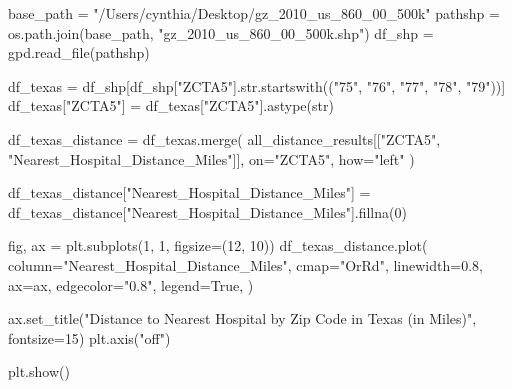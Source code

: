 \documentclass[
  letterpaper,
  DIV=11,
  numbers=noendperiod]{scrartcl}
\newenvironment{Shaded}{\begin{snugshade}}{\end{snugshade}}
\newcommand{\BuiltInTok}[1]{\textcolor[rgb]{0.00,0.23,0.31}{#1}}
\newcommand{\DecValTok}[1]{\textcolor[rgb]{0.68,0.00,0.00}{#1}}
\newcommand{\FloatTok}[1]{\textcolor[rgb]{0.68,0.00,0.00}{#1}}
\newcommand{\NormalTok}[1]{\textcolor[rgb]{0.00,0.23,0.31}{#1}}
\newcommand{\OperatorTok}[1]{\textcolor[rgb]{0.37,0.37,0.37}{#1}}
\newcommand{\StringTok}[1]{\textcolor[rgb]{0.13,0.47,0.30}{#1}}
\newcommand{\VariableTok}[1]{\textcolor[rgb]{0.07,0.07,0.07}{#1}}
\begin{document}
\begin{Shaded}
\begin{Highlighting}[]
\NormalTok{base\_path }\OperatorTok{=} \StringTok{"/Users/cynthia/Desktop/gz\_2010\_us\_860\_00\_500k"}
\NormalTok{pathshp }\OperatorTok{=}\NormalTok{ os.path.join(base\_path, }\StringTok{"gz\_2010\_us\_860\_00\_500k.shp"}\NormalTok{)}
\NormalTok{df\_shp }\OperatorTok{=}\NormalTok{ gpd.read\_file(pathshp)}

\NormalTok{df\_texas }\OperatorTok{=}\NormalTok{ df\_shp[df\_shp[}\StringTok{"ZCTA5"}\NormalTok{].}\BuiltInTok{str}\NormalTok{.startswith((}\StringTok{"75"}\NormalTok{, }\StringTok{"76"}\NormalTok{, }\StringTok{"77"}\NormalTok{, }\StringTok{"78"}\NormalTok{, }\StringTok{"79"}\NormalTok{))]}
\NormalTok{df\_texas[}\StringTok{"ZCTA5"}\NormalTok{] }\OperatorTok{=}\NormalTok{ df\_texas[}\StringTok{"ZCTA5"}\NormalTok{].astype(}\BuiltInTok{str}\NormalTok{)}

\NormalTok{df\_texas\_distance }\OperatorTok{=}\NormalTok{ df\_texas.merge(}
\NormalTok{    all\_distance\_results[[}\StringTok{"ZCTA5"}\NormalTok{, }\StringTok{"Nearest\_Hospital\_Distance\_Miles"}\NormalTok{]],}
\NormalTok{    on}\OperatorTok{=}\StringTok{"ZCTA5"}\NormalTok{,}
\NormalTok{    how}\OperatorTok{=}\StringTok{"left"}
\NormalTok{)}

\NormalTok{df\_texas\_distance[}\StringTok{"Nearest\_Hospital\_Distance\_Miles"}\NormalTok{] }\OperatorTok{=}\NormalTok{ df\_texas\_distance[}\StringTok{"Nearest\_Hospital\_Distance\_Miles"}\NormalTok{].fillna(}\DecValTok{0}\NormalTok{)}

\NormalTok{fig, ax }\OperatorTok{=}\NormalTok{ plt.subplots(}\DecValTok{1}\NormalTok{, }\DecValTok{1}\NormalTok{, figsize}\OperatorTok{=}\NormalTok{(}\DecValTok{12}\NormalTok{, }\DecValTok{10}\NormalTok{))}
\NormalTok{df\_texas\_distance.plot(}
\NormalTok{    column}\OperatorTok{=}\StringTok{"Nearest\_Hospital\_Distance\_Miles"}\NormalTok{,}
\NormalTok{    cmap}\OperatorTok{=}\StringTok{"OrRd"}\NormalTok{,  }
\NormalTok{    linewidth}\OperatorTok{=}\FloatTok{0.8}\NormalTok{,}
\NormalTok{    ax}\OperatorTok{=}\NormalTok{ax,}
\NormalTok{    edgecolor}\OperatorTok{=}\StringTok{"0.8"}\NormalTok{,}
\NormalTok{    legend}\OperatorTok{=}\VariableTok{True}\NormalTok{,}
\NormalTok{)}

\NormalTok{ax.set\_title(}\StringTok{"Distance to Nearest Hospital by Zip Code in Texas (in Miles)"}\NormalTok{, fontsize}\OperatorTok{=}\DecValTok{15}\NormalTok{)}
\NormalTok{plt.axis(}\StringTok{"off"}\NormalTok{)}

\NormalTok{plt.show()}
\end{Highlighting}
\end{Shaded}
\end{document}
